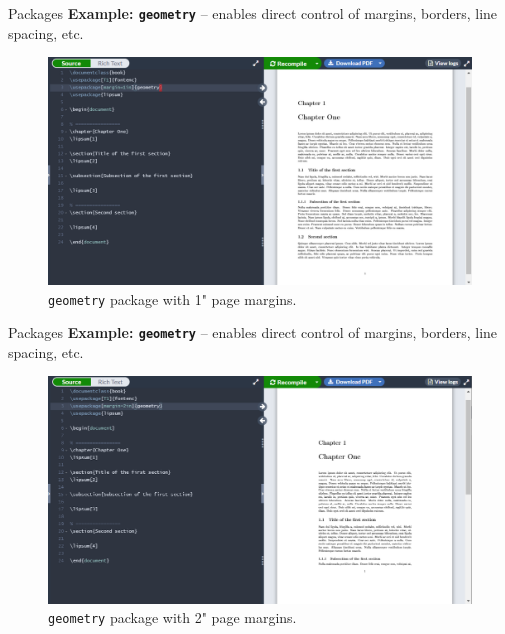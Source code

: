 \documentclass{beamer}
\begin{document}
{  %

  \begin{frame}{Packages}
    \textbf{Example: \texttt{geometry}} -- enables direct control of margins, borders, line spacing, etc.
    \begin{figure}
      \includegraphics[width=0.9\linewidth]{day01-overleaf-08C-package-geom-redux.png}
      \caption{\texttt{geometry} package with 1" page margins.}
      \label{fig:day01-overleaf-08C}
    \end{figure}
  \end{frame}

  \begin{frame}{Packages}
    \textbf{Example: \texttt{geometry}} -- enables direct control of margins, borders, line spacing, etc.
    \begin{figure}
      \includegraphics[width=0.9\linewidth]{day01-overleaf-08D-package-geom-redux.png}
      \caption{\texttt{geometry} package with 2" page margins.}
      \label{fig:day01-overleaf-08D}
    \end{figure}
  \end{frame}

}
\end{document}
